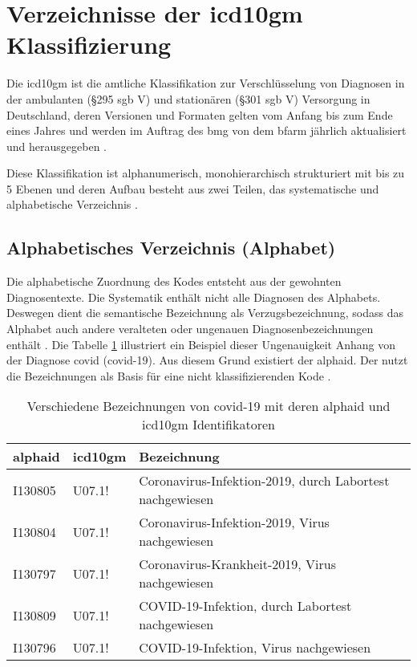\section{Verzeichnisse der \acs{icd10gm} Klassifizierung}

Die \ac{icd10gm} ist die amtliche Klassifikation zur Verschlüsselung von Diagnosen in der ambulanten (\S 295 \ac{sgb} V) und stationären (\S 301 \ac{sgb} V) Versorgung in Deutschland, deren Versionen und Formaten gelten vom Anfang bis zum Ende eines Jahres und werden im Auftrag des \ac{bmg} von dem \ac{bfarm} jährlich aktualisiert und herausgegeben \cite{icd10}. 

Diese Klassifikation ist alphanumerisch, monohierarchisch strukturiert mit bis zu 5 Ebenen und deren Aufbau besteht aus zwei Teilen, das systematische und alphabetische Verzeichnis \cite{icd10}.

\subsection{Alphabetisches Verzeichnis (Alphabet)} \label{alphadir}

Die alphabetische Zuordnung des Kodes entsteht aus der gewohnten Diagnosentexte. Die Systematik enthält nicht alle Diagnosen des Alphabets. Deswegen dient die semantische Bezeichnung als Verzugsbezeichnung, sodass das Alphabet auch andere veralteten oder ungenauen Diagnosenbezeichnungen enthält \cite{icd10alpha}. Die Tabelle \ref{tab:difbe} illustriert ein Beispiel dieser Ungenauigkeit Anhang von der Diagnose \acl{covid} (\acs{covid}-19). Aus diesem Grund existiert der \ac{alphaid}. Der nutzt die Bezeichnungen als Basis für eine nicht klassifizierenden Kode \cite{icd10alpha}.

\begin{table}[ht]
	\centering
	\small
	\caption[Verschiedene Bezeichnungen von COVID-19]{Verschiedene Bezeichnungen von \ac{covid}-19 mit deren \ac{alphaid} und \ac{icd10gm} Identifikatoren}
	\label{tab:difbe}
	\begin{tabular}{|l|l|l|}
		\hline
		\rowcolor{lightgray} \ac{alphaid} & \ac{icd10gm} & Bezeichnung \\
		\hline
		I130805 & U07.1! & Coronavirus-Infektion-2019, durch Labortest nachgewiesen \\ \hline
		I130804 & U07.1! & Coronavirus-Infektion-2019, Virus nachgewiesen \\ \hline
		I130797 & U07.1! & Coronavirus-Krankheit-2019, Virus nachgewiesen \\ \hline
		I130809 & U07.1! & COVID-19-Infektion, durch Labortest nachgewiesen \\ \hline
		I130796 & U07.1! & COVID-19-Infektion, Virus nachgewiesen \\ \hline				
	\end{tabular}
\end{table}

